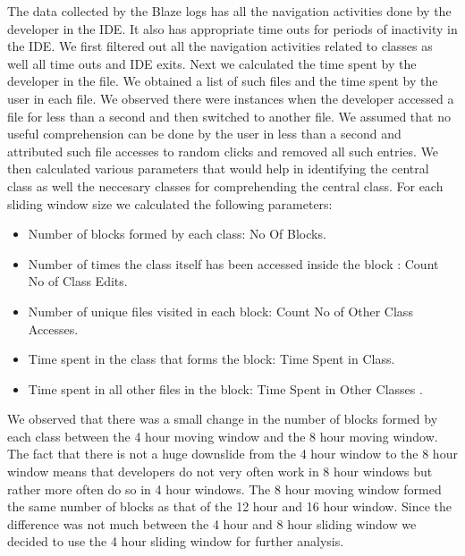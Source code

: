 The data collected by the Blaze logs has all the navigation activities done by the developer in the IDE. It also has appropriate time outs for periods of inactivity in the IDE. We first filtered out all the navigation activities related to classes as well all time outs and IDE exits. Next we calculated the time spent by the developer in the file. We obtained a list of such files and the time spent by the user in each file. We observed there were instances when the developer accessed a file for less than a second and then switched to another file. We assumed that no useful comprehension can be done by the user in less than a second and attributed such file accesses to random clicks and removed all such entries. We then calculated various parameters that would help in identifying the central class as well the neccesary classes for comprehending the central class. For each sliding window size we calculated the following parameters:
\begin{itemize}
	\item[] Number of blocks formed by each class: No Of Blocks.
	\item[] Number of times the class itself has been accessed inside the block : Count No of Class Edits.
	\item[] Number of unique files visited in each block: Count No of Other Class Accesses.
	\item[] Time spent in the class that forms the block: Time Spent in Class.
	\item[] Time spent in all other files in the block: Time Spent in Other Classes . 
\end{itemize}
We observed that there was a small change in the number of blocks formed by each class between the 4 hour moving window and the 8 hour moving window. The fact that there is not a huge downslide from the 4 hour window to the 8 hour window means that developers do not very often work in 8 hour windows but rather more often do so in 4 hour windows. The 8 hour moving window formed the same number of blocks as that of the 12 hour and 16 hour window. Since the difference was not much between the 4 hour and 8 hour sliding window we decided to use the 4 hour sliding window for further analysis.

